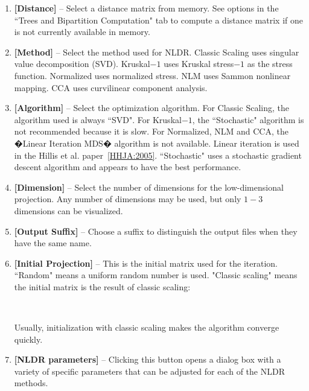 \documentclass[11pt]{article}
\begin{document}
\begin{enumerate}[{\bf 1-}]
\item {\bf [Distance]} -- Select a distance matrix from memory. See options in the ``Trees and
Bipartition Computation" tab to compute a distance matrix if one is not currently available in
memory.

\item {\bf [Method]} -- Select the method used for NLDR. Classic Scaling uses singular value
decomposition (SVD). Kruskal$-1$ uses Kruskal stress$-1$ as the stress function. Normalized
uses normalized stress. NLM uses Sammon nonlinear mapping. CCA uses curvilinear
component analysis.

\item {\bf [Algorithm]} -- Select the optimization algorithm. For Classic Scaling, the algorithm used is
always ``SVD". For Kruskal$-1$, the ``Stochastic" algorithm is not recommended because it is
slow. For Normalized, NLM and CCA, the �Linear Iteration MDS� algorithm is not available.
Linear iteration is used in the Hillis et al. paper~\ref{HHJA:2005}. ``Stochastic" uses a stochastic gradient descent algorithm and appears to have the best performance.

\item {\bf [Dimension]} -- Select the number of dimensions for the low-dimensional projection. Any
number of dimensions may be used, but only $1-3$ dimensions can be visualized.

\item {\bf [Output Suffix]} -- Choose a suffix to distinguish the output files when they have the same
name.

\item {\bf [Initial Projection]} --  This is the initial matrix used for the iteration. ``Random" means a
uniform random number is used. "Classic scaling" means the initial matrix is the result of
classic scaling:\\

\begin{sloppypar}\\ \end{sloppypar}

Usually, initialization with classic scaling makes the algorithm converge quickly.

\item {\bf [NLDR parameters]} -- Clicking this button opens a dialog box with a variety of specific
parameters that can be adjusted for each of the NLDR methods.


\end{enumerate}
\end{document}
